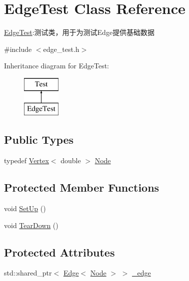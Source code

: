 \hypertarget{class_edge_test}{}\section{Edge\+Test Class Reference}
\label{class_edge_test}


\hyperlink{class_edge_test}{Edge\+Test}\+:测试类，用于为测试{\ttfamily Edge}提供基础数据  




{\ttfamily \#include $<$edge\+\_\+test.\+h$>$}

Inheritance diagram for Edge\+Test\+:\begin{figure}[H]
\begin{center}
\leavevmode
\includegraphics[height=2.000000cm]{class_edge_test}
\end{center}
\end{figure}
\subsection*{Public Types}
\begin{DoxyCompactItemize}
\item 
typedef \hyperlink{struct_introdunction_to_algorithm_1_1_graph_algorithm_1_1_vertex}{Vertex}$<$ double $>$ \hyperlink{class_edge_test_a983bfc4e56ab07fc54c55f71815d39e6}{Node}
\end{DoxyCompactItemize}
\subsection*{Protected Member Functions}
\begin{DoxyCompactItemize}
\item 
void \hyperlink{class_edge_test_af1f1a79b9cc810c2548e1d2d0071f1bc}{Set\+Up} ()
\item 
void \hyperlink{class_edge_test_a14e4e78eddefbfedeebeb075fa74cbad}{Tear\+Down} ()
\end{DoxyCompactItemize}
\subsection*{Protected Attributes}
\begin{DoxyCompactItemize}
\item 
std\+::shared\+\_\+ptr$<$ \hyperlink{struct_introdunction_to_algorithm_1_1_graph_algorithm_1_1_edge}{Edge}$<$ \hyperlink{class_edge_test_a983bfc4e56ab07fc54c55f71815d39e6}{Node} $>$ $>$ \hyperlink{class_edge_test_a8ab903577f2907ee1110d5f5f4d16b83}{\+\_\+edge}
\end{DoxyCompactItemize}


